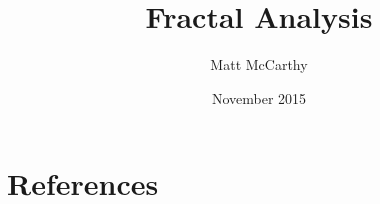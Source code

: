 \documentclass[12pt]{paper}
\title{Fractal Analysis}
\date{November 2015}
\author{Matt McCarthy}
\begin{document}
\maketitle



\section*{References}

\printbibliography
\end{document}
